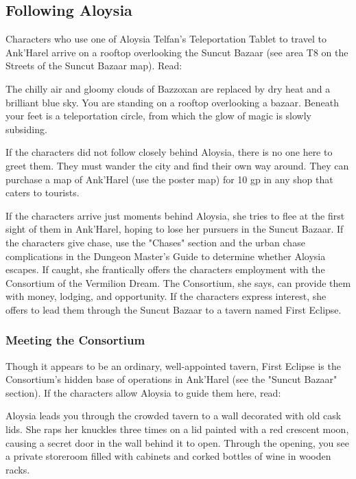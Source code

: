 \documentclass[10pt,a4paper,twoside,twocolumn,openany,nodeprecatedcode]{dndbook}
\begin{document}
\subsection{Following Aloysia}
Characters who use one of Aloysia Telfan's Teleportation Tablet to travel to Ank'Harel arrive on a rooftop overlooking the Suncut Bazaar (see area T8 on the Streets of the Suncut Bazaar map). Read:

\begin{DndReadAloud}{}
The chilly air and gloomy clouds of Bazzoxan are replaced by dry heat and a brilliant blue sky. You are standing on a rooftop overlooking a bazaar. Beneath your feet is a teleportation circle, from which the glow of magic is slowly subsiding.

\end{DndReadAloud}

If the characters did not follow closely behind Aloysia, there is no one here to greet them. They must wander the city and find their own way around. They can purchase a map of Ank'Harel (use the poster map) for 10 gp in any shop that caters to tourists.

If the characters arrive just moments behind Aloysia, she tries to flee at the first sight of them in Ank'Harel, hoping to lose her pursuers in the Suncut Bazaar. If the characters give chase, use the "Chases" section and the urban chase complications in the Dungeon Master's Guide to determine whether Aloysia escapes. If caught, she frantically offers the characters employment with the Consortium of the Vermilion Dream. The Consortium, she says, can provide them with money, lodging, and opportunity. If the characters express interest, she offers to lead them through the Suncut Bazaar to a tavern named First Eclipse.

\subsubsection{Meeting the Consortium}
Though it appears to be an ordinary, well-appointed tavern, First Eclipse is the Consortium's hidden base of operations in Ank'Harel (see the "Suncut Bazaar" section). If the characters allow Aloysia to guide them here, read:

\begin{DndReadAloud}{}
Aloysia leads you through the crowded tavern to a wall decorated with old cask lids. She raps her knuckles three times on a lid painted with a red crescent moon, causing a secret door in the wall behind it to open. Through the opening, you see a private storeroom filled with cabinets and corked bottles of wine in wooden racks.

\end{DndReadAloud}
\end{document}
